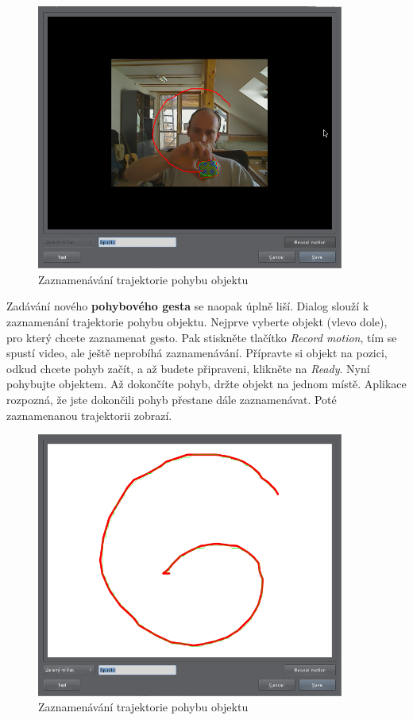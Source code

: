 \begin{figure}[h]
\centering
\includegraphics[width=0.9\textwidth]{newmotiongesture1.png}
\caption{Zaznamenávání trajektorie pohybu objektu}
\label{fig:newrelationgesture1}
\end{figure}

Zadávání nového \textbf{pohybového gesta} se naopak úplně liší. Dialog slouží
k zaznamenání trajektorie pohybu objektu. Nejprve vyberte objekt (vlevo dole),
pro který chcete zaznamenat gesto. Pak stiskněte tlačítko \emph{Record
motion}, tím se spustí video, ale ještě neprobíhá zaznamenávání. Přípravte si
objekt na pozici, odkud chcete pohyb začít, a až budete připraveni, klikněte na
\emph{Ready}. Nyní pohybujte objektem. Až dokončíte pohyb, držte objekt na
jednom místě. Aplikace rozpozná, že jste dokončili pohyb přestane dále
zaznamenávat. Poté zaznamenanou trajektorii zobrazí.

\begin{figure}[h]
\centering
\includegraphics[width=0.9\textwidth]{newmotiongesture2.png}
\caption{Zaznamenávání trajektorie pohybu objektu}
\label{fig:newrelationgesture2}
\end{figure}

